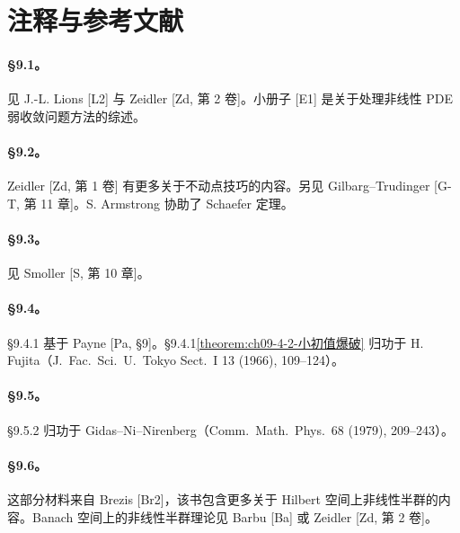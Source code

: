 \documentclass[../../main.tex]{subfiles}
\begin{document}
\section{注释与参考文献}\label{section:ch09-8-参考文献}

\paragraph{\S9.1。}见 J.-L. Lions [L2] 与 Zeidler [Zd, 第 2 卷]。小册子 [E1] 是关于处理非线性 PDE 弱收敛问题方法的综述。

\paragraph{\S9.2。}Zeidler [Zd, 第 1 卷] 有更多关于不动点技巧的内容。另见 Gilbarg--Trudinger [G-T, 第 11 章]。S. Armstrong 协助了 Schaefer 定理。

\paragraph{\S9.3。}见 Smoller [S, 第 10 章]。

\paragraph{\S9.4。}\S9.4.1 基于 Payne [Pa, \S9]。\S9.4.1\cref{theorem:ch09-4-2-小初值爆破} 归功于 H. Fujita（J.\ Fac.\ Sci.\ U.\ Tokyo Sect.\ I 13 (1966), 109--124）。

\paragraph{\S9.5。}\S9.5.2 归功于 Gidas--Ni--Nirenberg（Comm.\ Math.\ Phys.\ 68 (1979), 209--243）。

\paragraph{\S9.6。}这部分材料来自 Brezis [Br2]，该书包含更多关于 Hilbert 空间上非线性半群的内容。Banach 空间上的非线性半群理论见 Barbu [Ba] 或 Zeidler [Zd, 第 2 卷]。
\end{document}
